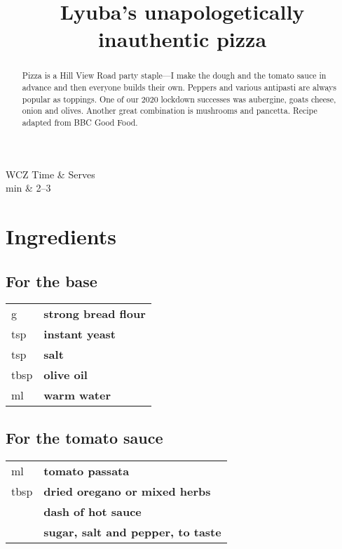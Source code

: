 \documentclass[main.tex]{subfiles}
\title{Lyuba's unapologetically inauthentic pizza}
\begin{document}
\maketitle

\begin{margintable}
\begin{tabularx}{\textwidth}{WCZ}
Time  & Serves\\ 
 min & 2--3
\end{tabularx}
\end{margintable}

\begin{abstract}
Pizza is a Hill View Road party staple---I make the dough and the tomato sauce in advance and then everyone builds their own. Peppers and various antipasti are always popular as toppings. One of our 2020 lockdown successes was aubergine, goats cheese, onion and olives. Another great combination is mushrooms and pancetta.
\linebreak
Recipe adapted from BBC Good Food.
\end{abstract}

\section{Ingredients}

\subsection{For the base}
\vspace*{-\baselineskip}
\begin{table}[ht]
	\begin{tabularx}{\textwidth}{>{\hsize=0.333\hsize}X>{\bf\hsize=1\hsize}X}
	\unit[300]{g} & strong bread flour\\
	\unit[1]{tsp} & instant yeast\\
	\unit[1]{tsp} & salt\\
	\unit[1]{tbsp} & olive oil\\
	\unit[200]{ml} & warm water\\
	\end{tabularx}
\end{table}

\subsection{For the tomato sauce}
\vspace*{-\baselineskip}
\begin{table}[ht]
	\begin{tabularx}{\textwidth}{>{\hsize=0.333\hsize}X>{\bf\hsize=1\hsize}X}
	\unit[100]{ml} & tomato passata\\
	\unit[1]{tbsp} & dried oregano or mixed herbs\\
	\unit[]{} & dash of hot sauce\\
	\unit[]{} & sugar, salt and pepper, to taste\\
	\end{tabularx}
\end{table}
\end{document}
